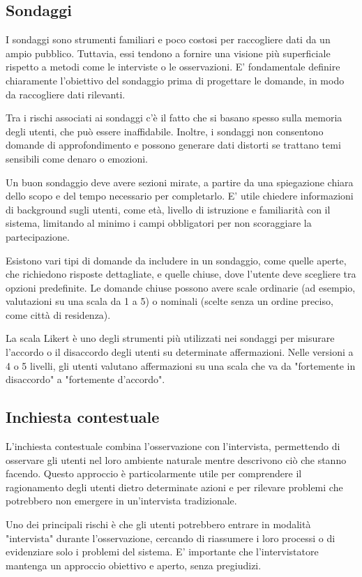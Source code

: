 \subsection{Sondaggi}
I sondaggi sono strumenti familiari e poco costosi per raccogliere dati da un ampio pubblico. Tuttavia, essi tendono a fornire una visione più superficiale rispetto a metodi come le interviste o le osservazioni. E' fondamentale definire chiaramente l'obiettivo del sondaggio prima di progettare le domande, in modo da raccogliere dati rilevanti.

Tra i rischi associati ai sondaggi c'è il fatto che si basano spesso sulla memoria degli utenti, che può essere inaffidabile. Inoltre, i sondaggi non consentono domande di approfondimento e possono generare dati distorti se trattano temi sensibili come denaro o emozioni.

Un buon sondaggio deve avere sezioni mirate, a partire da una spiegazione chiara dello scopo e del tempo necessario per completarlo. E' utile chiedere informazioni di background sugli utenti, come età, livello di istruzione e familiarità con il sistema, limitando al minimo i campi obbligatori per non scoraggiare la partecipazione.

Esistono vari tipi di domande da includere in un sondaggio, come quelle aperte, che richiedono risposte dettagliate, e quelle chiuse, dove l'utente deve scegliere tra opzioni predefinite. Le domande chiuse possono avere scale ordinarie (ad esempio, valutazioni su una scala da 1 a 5) o nominali (scelte senza un ordine preciso, come città di residenza).

La scala Likert è uno degli strumenti più utilizzati nei sondaggi per misurare l'accordo o il disaccordo degli utenti su determinate affermazioni. Nelle versioni a 4 o 5 livelli, gli utenti valutano affermazioni su una scala che va da "fortemente in disaccordo" a "fortemente d'accordo".

\subsection{Inchiesta contestuale}
L'inchiesta contestuale combina l'osservazione con l'intervista, permettendo di osservare gli utenti nel loro ambiente naturale mentre descrivono ciò che stanno facendo. Questo approccio è particolarmente utile per comprendere il ragionamento degli utenti dietro determinate azioni e per rilevare problemi che potrebbero non emergere in un'intervista tradizionale.

Uno dei principali rischi è che gli utenti potrebbero entrare in modalità "intervista" durante l'osservazione, cercando di riassumere i loro processi o di evidenziare solo i problemi del sistema. E' importante che l'intervistatore mantenga un approccio obiettivo e aperto, senza pregiudizi.

